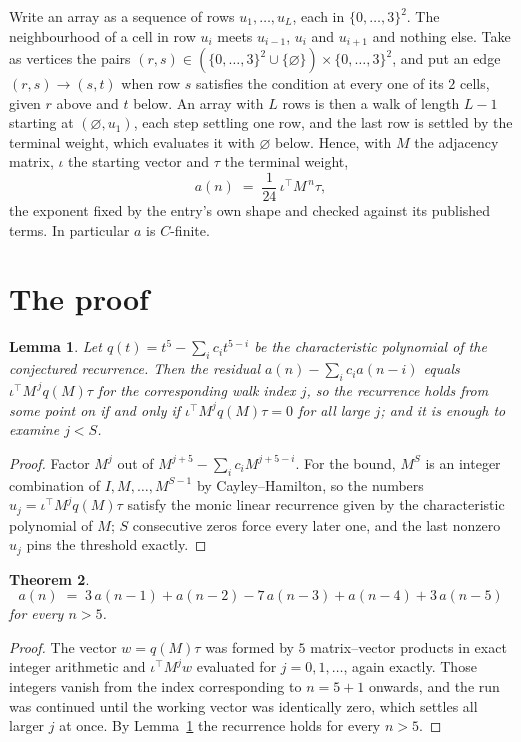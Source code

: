 \documentclass[11pt,a4paper]{article}
\theoremstyle{plain}
\newtheorem{theorem}{Theorem}
\newtheorem{lemma}[theorem]{Lemma}
\theoremstyle{definition}
\begin{document}
Write an array as a sequence of rows $u_1,\dots,u_L$, each in
$\{0,\dots,3\}^{2}$. The neighbourhood of a cell in row $u_i$ meets $u_{i-1}$,
$u_i$ and $u_{i+1}$ and nothing else. Take as vertices the pairs
$(r,s)\in(\{0,\dots,3\}^{2}\cup\{\varnothing\})\times\{0,\dots,3\}^{2}$,
and put an edge $(r,s)\to(s,t)$ when row $s$ satisfies the condition at every one of its
$2$ cells, given $r$ above and $t$ below. An array with $L$ rows is then a walk of length
$L-1$ starting at $(\varnothing,u_1)$, each step settling one row, and the last row is
settled by the terminal weight, which evaluates it with $\varnothing$ below. Hence,
with $M$ the adjacency matrix, $\iota$ the starting vector and $\tau$ the terminal weight,
\[
a(n)\;=\;\frac{1}{24}\,\iota^{\!\top}M^{\,n}\tau ,
\]
the exponent fixed by the entry's own shape and checked against its published terms. In
particular $a$ is $C$-finite.

\section{The proof}

\begin{lemma}\label{lem:crit}
Let $q(t)=t^{5}-\sum_i c_it^{5-i}$ be the characteristic polynomial of the
conjectured recurrence. Then the residual $a(n)-\sum_ic_ia(n-i)$ equals
$\iota^{\!\top}M^{\,j}q(M)\tau$ for the corresponding walk index $j$, so the
recurrence holds from some point on if and only if $\iota^{\!\top}M^{j}q(M)\tau=0$ for all
large $j$; and it is enough to examine $j<S$.
\end{lemma}

\begin{proof}
Factor $M^{j}$ out of $M^{j+5}-\sum_ic_iM^{j+5-i}$. For the bound, $M^{S}$
is an integer combination of $I,M,\dots,M^{S-1}$ by Cayley--Hamilton, so the numbers
$u_j=\iota^{\!\top}M^{j}q(M)\tau$ satisfy the monic linear recurrence given by the
characteristic polynomial of $M$; $S$ consecutive zeros force every later one, and the last
nonzero $u_j$ pins the threshold exactly.
\end{proof}

\begin{theorem}
\[
a(n)\;=\;3\,a(n-1) + a(n-2) - 7\,a(n-3) + a(n-4) + 3\,a(n-5)
\]
for every $n>5$.
\end{theorem}

\begin{proof}
The vector $w=q(M)\tau$ was formed by $5$ matrix--vector products in exact integer
arithmetic and $\iota^{\!\top}M^{j}w$ evaluated for $j=0,1,\dots$, again exactly. Those
integers vanish from the index corresponding to $n=5+1$ onwards, and the run was
continued until the working vector was identically zero, which settles all larger $j$ at once.
By Lemma~\ref{lem:crit} the recurrence holds for every $n>5$.
\end{proof}
\end{document}
